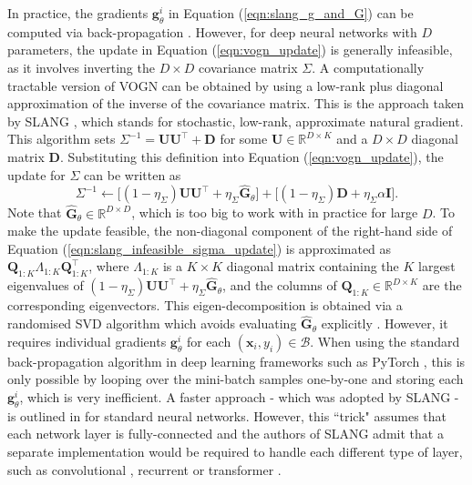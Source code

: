 \documentclass[msc,deptreport.inf]{infthesis} %
\newcommand{\matr}[1]{\mathbf{#1}}
\newcommand{\R}{\mathbb R}
\begin{document}
In practice, the gradients $\matr{g}_\theta^i$ in Equation (\ref{eqn:slang_g_and_G}) can be computed via back-propagation \cite{rumelhart1986}. However, for deep neural networks with $D$ parameters, the update in Equation (\ref{eqn:vogn_update}) is generally infeasible, as it involves inverting the $D \times D$ covariance matrix $\Sigma$. A computationally tractable version of VOGN can be obtained by using a low-rank plus diagonal approximation of the inverse of the covariance matrix. This is the approach taken by SLANG \cite{mishkin2018}, which stands for stochastic, low-rank, approximate natural gradient. This algorithm sets $\Sigma^{-1} = \matr{U} \matr{U}^\intercal + \matr{D}$ for some $\matr{U} \in \R^{D \times K}$ and a $D \times D$ diagonal matrix $\matr{D}$. Substituting this definition into Equation (\ref{eqn:vogn_update}), the update for $\Sigma$ can be written as
\begin{equation}\label{eqn:slang_infeasible_sigma_update}
	\Sigma^{-1} \leftarrow 
	\big[(1 - \eta_\Sigma) \matr{U} \matr{U}^\intercal + \eta_\Sigma \hat{\matr{G}}_\theta \big] 
	+ \big[(1 - \eta_\Sigma) \matr{D} + \eta_\Sigma \alpha \matr{I}\big].
\end{equation}
Note that $\hat{\matr{G}}_\theta \in \R^{D\times D}$, which is too big to work with in practice for large $D$. To make the update feasible, 
the non-diagonal component of the right-hand side of Equation (\ref{eqn:slang_infeasible_sigma_update}) is approximated as $\matr{Q}_{1:K} \Lambda_{1:K} \matr{Q}_{1:K}^\intercal$,
where $\Lambda_{1:K}$ is a $K \times K$ diagonal matrix containing the $K$ largest eigenvalues of $(1 - \eta_\Sigma) \matr{U} \matr{U}^\intercal + \eta_\Sigma \hat{\matr{G}}_\theta$, and the columns of $\matr{Q}_{1:K} \in \R^{D \times K}$ are the corresponding eigenvectors. This eigen-decomposition is obtained via a randomised SVD algorithm which avoids evaluating $\hat{\matr{G}}_\theta$ explicitly \cite{mishkin2018}. However, it requires individual gradients $\matr{g}_\theta^i$ for each  $(\matr{x}_i, y_i) \in \mathcal{B}$. When using the standard back-propagation algorithm in deep learning frameworks such as PyTorch \cite{paszke2019}, this is only possible by looping over the mini-batch samples one-by-one and storing each $\matr{g}_\theta^i$, which is very inefficient. A faster approach - which was adopted by SLANG - is outlined in \cite{goodfellow2015} for standard neural networks. However, this ``trick" assumes that each network layer is fully-connected and the authors of SLANG admit that a separate implementation would be required to handle each different type of layer, such as convolutional \cite{krizhevsky09}, recurrent \cite{hochreiter1997} or transformer \cite{vaswani2017}.
\end{document}
